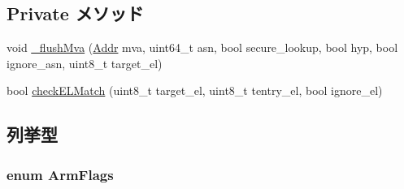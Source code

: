 \subsection*{Private メソッド}
\begin{DoxyCompactItemize}
\item 
void \hyperlink{classArmISA_1_1TLB_ab44854fd690d81090e18a5a7ba3850be}{\_\-flushMva} (\hyperlink{classm5_1_1params_1_1Addr}{Addr} mva, uint64\_\-t asn, bool secure\_\-lookup, bool hyp, bool ignore\_\-asn, uint8\_\-t target\_\-el)
\item 
bool \hyperlink{classArmISA_1_1TLB_a58d5b81b2c0a67f5780f391dfea47e3a}{checkELMatch} (uint8\_\-t target\_\-el, uint8\_\-t tentry\_\-el, bool ignore\_\-el)
\end{DoxyCompactItemize}


\subsection{列挙型}
\hypertarget{classArmISA_1_1TLB_a1e31c6b4a233c7e98a3e85eba0c84f0d}{
\subsubsection[{ArmFlags}]{\setlength{\rightskip}{0pt plus 5cm}enum {\bf ArmFlags}}}
\label{classArmISA_1_1TLB_a1e31c6b4a233c7e98a3e85eba0c84f0d}
